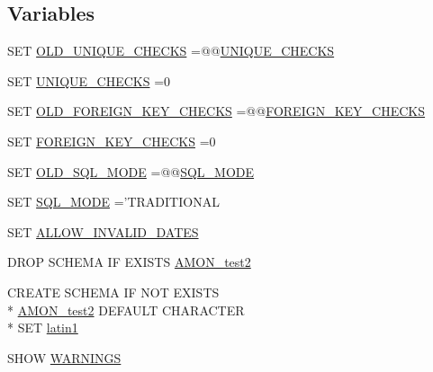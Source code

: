 \subsection*{Variables}
\begin{DoxyCompactItemize}
\item 
S\-E\-T \hyperlink{db__mc__build_8sql_a7e19709fb37277caa827eb2c0b4ede3f}{O\-L\-D\-\_\-\-U\-N\-I\-Q\-U\-E\-\_\-\-C\-H\-E\-C\-K\-S} =@@\hyperlink{db__mc__build_8sql_a925de1b16b086a8c891972b8650dd849}{U\-N\-I\-Q\-U\-E\-\_\-\-C\-H\-E\-C\-K\-S}
\item 
S\-E\-T \hyperlink{db__mc__build_8sql_a925de1b16b086a8c891972b8650dd849}{U\-N\-I\-Q\-U\-E\-\_\-\-C\-H\-E\-C\-K\-S} =0
\item 
S\-E\-T \hyperlink{db__mc__build_8sql_aed660808bdaf52f67fbe9579357fcbb4}{O\-L\-D\-\_\-\-F\-O\-R\-E\-I\-G\-N\-\_\-\-K\-E\-Y\-\_\-\-C\-H\-E\-C\-K\-S} =@@\hyperlink{db__mc__build_8sql_a35e8144ba9b677eb577b84f0a7366c98}{F\-O\-R\-E\-I\-G\-N\-\_\-\-K\-E\-Y\-\_\-\-C\-H\-E\-C\-K\-S}
\item 
S\-E\-T \hyperlink{db__mc__build_8sql_a35e8144ba9b677eb577b84f0a7366c98}{F\-O\-R\-E\-I\-G\-N\-\_\-\-K\-E\-Y\-\_\-\-C\-H\-E\-C\-K\-S} =0
\item 
S\-E\-T \hyperlink{db__mc__build_8sql_ad533f6b3dc318376064708a1df9b43ee}{O\-L\-D\-\_\-\-S\-Q\-L\-\_\-\-M\-O\-D\-E} =@@\hyperlink{db__mc__build_8sql_a330bb31afceaa2ed02fe330e68e347c1}{S\-Q\-L\-\_\-\-M\-O\-D\-E}
\item 
S\-E\-T \hyperlink{db__mc__build_8sql_a330bb31afceaa2ed02fe330e68e347c1}{S\-Q\-L\-\_\-\-M\-O\-D\-E} ='T\-R\-A\-D\-I\-T\-I\-O\-N\-A\-L
\item 
S\-E\-T \hyperlink{db__mc__build_8sql_adbed2a6ee14af6c05021f7e12cda5f6c}{A\-L\-L\-O\-W\-\_\-\-I\-N\-V\-A\-L\-I\-D\-\_\-\-D\-A\-T\-E\-S}
\item 
D\-R\-O\-P S\-C\-H\-E\-M\-A I\-F E\-X\-I\-S\-T\-S \hyperlink{db__mc__build_8sql_a19c21c59303d8b6591b92240ff7de1d5}{A\-M\-O\-N\-\_\-test2}
\item 
C\-R\-E\-A\-T\-E S\-C\-H\-E\-M\-A I\-F N\-O\-T E\-X\-I\-S\-T\-S \\*
\hyperlink{db__mc__build_8sql_a19c21c59303d8b6591b92240ff7de1d5}{A\-M\-O\-N\-\_\-test2} D\-E\-F\-A\-U\-L\-T C\-H\-A\-R\-A\-C\-T\-E\-R \\*
S\-E\-T \hyperlink{db__mc__build_8sql_a145c9c55e2feb6e7b5660e2d330c2e3d}{latin1}
\item 
S\-H\-O\-W \hyperlink{db__mc__build_8sql_a130401f26b798bc83d6bd014ad42afdc}{W\-A\-R\-N\-I\-N\-G\-S}
\item 

\end{DoxyCompactItemize}
